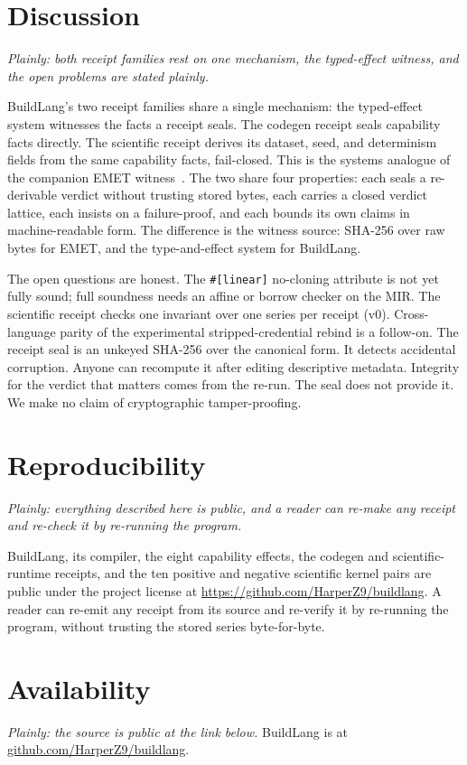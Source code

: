 \documentclass[11pt]{article}
\begin{document}
\section{Discussion}
\emph{Plainly: both receipt families rest on one mechanism, the typed-effect witness, and the open problems are stated plainly.}

BuildLang's two receipt families share a single mechanism: the typed-effect system witnesses the facts a receipt seals. The codegen receipt seals capability facts directly. The scientific receipt derives its dataset, seed, and determinism fields from the same capability facts, fail-closed. This is the systems analogue of the companion EMET witness~\cite{emet}. The two share four properties: each seals a re-derivable verdict without trusting stored bytes, each carries a closed verdict lattice, each insists on a failure-proof, and each bounds its own claims in machine-readable form. The difference is the witness source: SHA-256 over raw bytes for EMET, and the type-and-effect system for BuildLang.

The open questions are honest. The \texttt{\#[linear]} no-cloning attribute is not yet fully sound; full soundness needs an affine or borrow checker on the MIR. The scientific receipt checks one invariant over one series per receipt (v0). Cross-language parity of the experimental stripped-credential rebind is a follow-on. The receipt seal is an unkeyed SHA-256 over the canonical form. It detects accidental corruption. Anyone can recompute it after editing descriptive metadata. Integrity for the verdict that matters comes from the re-run. The seal does not provide it. We make no claim of cryptographic tamper-proofing.

\section{Reproducibility}
\emph{Plainly: everything described here is public, and a reader can re-make any receipt and re-check it by re-running the program.}

BuildLang, its compiler, the eight capability effects, the codegen and scientific-runtime receipts, and the ten positive and negative scientific kernel pairs are public under the project license at \url{https://github.com/HarperZ9/buildlang}. A reader can re-emit any receipt from its source and re-verify it by re-running the program, without trusting the stored series byte-for-byte.

\section*{Availability}
\emph{Plainly: the source is public at the link below.}
BuildLang is at \href{https://github.com/HarperZ9/buildlang}{github.com/HarperZ9/buildlang}.
\end{document}
